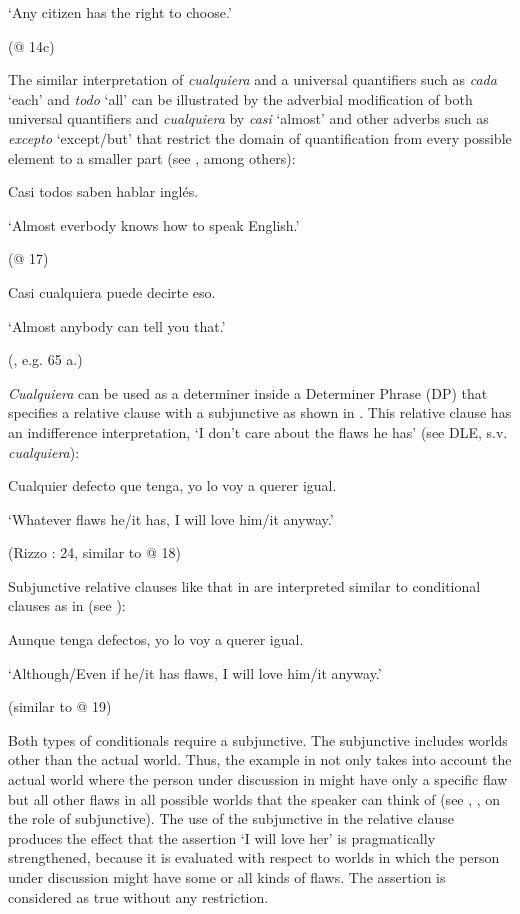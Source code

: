 \documentclass[output=paper]{langscibook}
\begin{document}
  ‘Any citizen has the right to choose.’

  (@ 14c)

The similar interpretation of \textit{cualquiera} and a universal quantifiers such as \textit{cada} ‘each’ and \textit{todo} ‘all’ can be illustrated by the adverbial modification of both universal quantifiers and \textit{cualquiera} by \textit{casi} ‘almost’ and other adverbs such as \textit{excepto} ‘except/but’ that restrict the domain of quantification from every possible element to a smaller part (see \citealt{Arregui2006}, among others):

  Casi todos saben hablar inglés. 

  ‘Almost everbody knows how to speak English.’

  (@ 17)

  Casi cualquiera puede decirte eso.

  ‘Almost anybody can tell you that.’

  (\citealt{Arregui2006}, e.g. 65 a.)

\textit{Cualquiera} can be used as a determiner inside a Determiner Phrase (DP) that specifies a relative clause with a subjunctive as shown in . This relative clause has an indifference interpretation, ‘I don’t care about the flaws he has’ (see DLE, s.v. \textit{cualquiera}):

\label{bkm:Ref512708}  Cualquier defecto que tenga, yo lo voy a querer igual.

  ‘Whatever flaws he/it has, I will love him/it anyway.’

  (Rizzo \citealt{Salierno2013}: 24, similar to @ 18)

Subjunctive relative clauses like that in  are interpreted similar to conditional clauses as in  (see \citealt{Quer2000}):

\label{bkm:Ref513122}  Aunque tenga defectos, yo lo voy a querer igual.

  ‘Although/Even if he/it has flaws, I will love him/it anyway.’

  (similar to @ 19)

Both types of conditionals require a subjunctive. The subjunctive includes worlds other than the actual world. Thus, the example in  not only takes into account the actual world where the person under discussion in might have only a specific flaw but all other flaws in all possible worlds that the speaker can think of (see \citealt{Quer2000}, \citealt{Chierchia2006}, \citealt{Becker2014} on the role of subjunctive). The use of the subjunctive in the relative clause produces the effect that the assertion ‘I will love her’ is pragmatically strengthened, because it is evaluated with respect to worlds in which the person under discussion might have some or all kinds of flaws. The assertion is considered as true without any restriction. 
\end{document}
